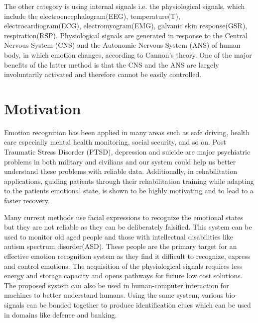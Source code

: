 \documentclass[11pt]{article}
\theoremstyle{definition}
\begin{document}
    The other category is using internal signals i.e. the physiological signals, which include the electroencephalogram(EEG), temperature(T), electrocardiogram(ECG), electromyogram(EMG), galvanic skin response(GSR), respiration(RSP).
    Physiological signals are generated in response to the Central Nervous System (CNS) and the Autonomic Nervous System (ANS) of human body, in which emotion changes, according to Cannon’s theory\cite{cannon_james-lange_1927}.
    One of the major benefits of the latter method is that the CNS and the ANS are largely involuntarily activated and therefore cannot be easily controlled.

  \section{Motivation}
    Emotion recognition has been applied in many areas such as safe driving\cite{de_nadai_enhancing_2016}, health care\cite{guo_pervasive_2013} especially mental health monitoring\cite{verschuere_psychopathy_2006}, social security\cite{noauthor_facial_nodate}, and so on.
    Post Traumatic Stress Disorder (PTSD), depression and suicide are major psychiatric problems in both military and civilians\cite{bryan_combat_2013, tarrier_suicide_2004} and our system could help us better understand these problems with reliable data.
    Additionally, in rehabilitation applications, guiding patients through their rehabilitation training while adapting to the patients emotional state, is shown to be highly motivating and to lead to a faster recovery\cite{evans_positive_2011}.

    Many current methods use facial expressions to recognize the emotional states but they are not reliable as they can be deliberately falsified\cite{cannon_james-lange_1927}.
    This system can be used to monitor old aged people and those with intellectual disabilities like autism spectrum disorder(ASD).
    These people are the primary target for an effective emotion recognition system as they find it difficult to recognize, express and control emotions\cite{sparks_brain_2002}.
    The acquisition of the physiological signals requires less energy and storage capacity and opens pathways for future low cost solutions.
    The proposed system can also be used in human-computer interaction for machines to better understand humans\cite{molina_emotional_2009}.
    Using the same system, various bio-signals can be bonded together to produce identification clues which can be used in domains like defence and banking\cite{kim_biometric_2009}.
\end{document}
